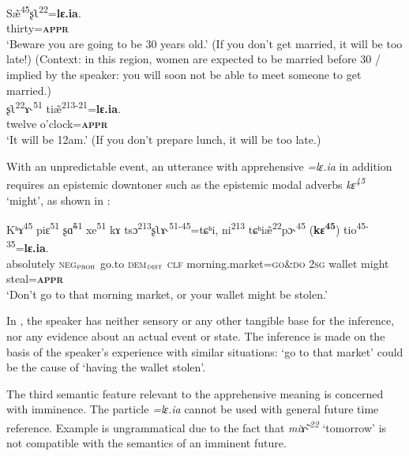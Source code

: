\documentclass[output=paper,colorlinks,citecolor=brown, language=chinese]{langscibook}
\begin{document}
\ea \label{ex:Song31}
\ea \label{ex:Song31a} %
\gll S\~æ\textsuperscript{45}ʂʅ\textsuperscript{22}=\textbf{lɛ.ia}. \\
thirty=\textbf{\textsc{appr}}\\
\glt `Beware you are going to be 30 years old.' (If you don't get married, it will be too late!) (Context: in this region, women are expected to be married before 30 / implied by the speaker: you will soon not be able to meet someone to get married.) \\
\ex \label{ex:Song31b} %
\gll ʂʅ\textsuperscript{22}ɤ˞\textsuperscript{51} ti\~æ\textsuperscript{213-21}=\textbf{lɛ.ia}. \\
twelve o'clock=\textsc{\textbf{appr}}\\
\glt `It will be 12am.' (If you don't prepare lunch, it will be too late.)
\z
\z

 With an unpredictable event, an utterance with apprehensive \textit{=lɛ.ia} in addition requires an epistemic downtoner such as the epistemic modal adverbs \textit{kε\textsuperscript{45}} `might', as shown in :

\ea\label{ex:Song32}
\gll Kʰɤ\textsuperscript{45} piε\textsuperscript{51} ʂ\~ɑ\textsuperscript{51}	xe\textsuperscript{51} kɤ tsɔ\textsuperscript{213}ʂʅɤ˞\textsuperscript{51-45}=tɕʰi, ni\textsuperscript{213} tɕʰi\~æ\textsuperscript{22}pɔ˞\textsuperscript{45} \*(\textbf{kε\textsuperscript{45}}) tio\textsuperscript{45-35}=\textbf{lɛ.ia}. \\
absolutely \textsc{neg$_{\textsc{proh}}$} go.to \textsc{dem}$_{\textsc{dist}}$ \textsc{clf} morning.market=\textsc{go\&do} \textsc{2sg} wallet might steal=\textsc{\textbf{appr}} \\
\glt `Don't go to that morning market, or your wallet might be stolen.'
\z

In , the speaker has neither sensory or any other tangible base for the inference, nor any evidence about an actual event or state. The inference is made on the basis of the speaker's experience with similar situations: `go to that market' could be the cause of `having the wallet stolen'.

The third semantic feature relevant to the apprehensive meaning is concerned with imminence. The particle \textit{=lɛ.ia} cannot be used with general future time reference. Example  is ungrammatical due to the fact that \textit{mi\~ɤ˞\textsuperscript{22}} `tomorrow' is not compatible with the semantics of an imminent future.
\end{document}
